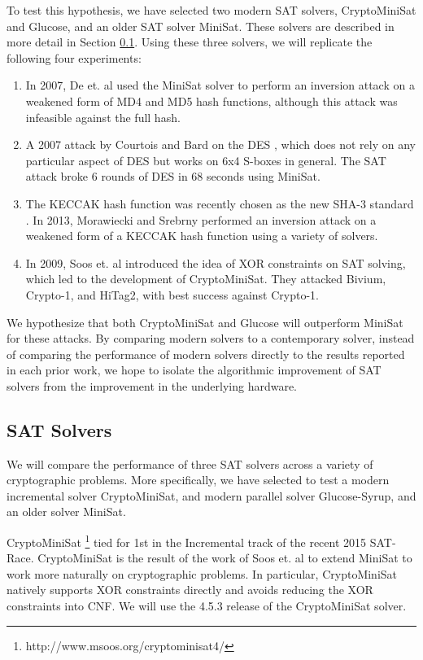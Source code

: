 To test this hypothesis, we have selected two modern SAT solvers, CryptoMiniSat and Glucose, and an older SAT solver MiniSat. These solvers are described in more detail in Section \ref{sec:existingtools}. Using these three solvers, we will replicate the following four experiments:
\begin{enumerate}
	\item In 2007, De et. al \cite{DKV07} used the MiniSat solver to perform an inversion attack on a weakened form of MD4 and MD5 hash functions, although this attack was infeasible against the full hash.
	
	\item A 2007 attack by Courtois and Bard on the DES \cite{CB07}, which does not rely on any particular aspect of DES but works on 6x4 S-boxes in general. The SAT attack broke 6 rounds of DES in 68 seconds using MiniSat.
	
	\item The KECCAK hash function was recently chosen as the new SHA-3 standard \cite{USDOC15}. In 2013, Morawiecki and Srebrny \cite{MS13} performed an inversion attack on a weakened form of a {KECCAK} hash function using a variety of solvers. 
	
	\item In 2009, Soos et. al \cite{SNC09} introduced the idea of XOR constraints on SAT solving, which led to the development of CryptoMiniSat. They attacked Bivium, Crypto-1, and HiTag2, with best success against Crypto-1.
\end{enumerate}

We hypothesize that both CryptoMiniSat and Glucose will outperform MiniSat for these attacks. By comparing modern solvers to a contemporary solver, instead of comparing the performance of modern solvers directly to the results reported in each prior work, we hope to isolate the algorithmic improvement of SAT solvers from the improvement in the underlying hardware.

\subsection{SAT Solvers}
\label{sec:existingtools}

We will compare the performance of three SAT solvers across a variety of cryptographic problems. More specifically, we have selected to test a modern incremental solver CryptoMiniSat, and modern parallel solver Glucose-Syrup, and an older solver MiniSat.

CryptoMiniSat \footnote{http://www.msoos.org/cryptominisat4/} tied for 1st in the Incremental track of the recent 2015 SAT-Race. CryptoMiniSat is the result of the work of Soos et. al \cite{SNC09} to extend MiniSat to work more naturally on cryptographic problems.  In particular, CryptoMiniSat natively supports XOR constraints directly and avoids reducing the XOR constraints into CNF. We will use the 4.5.3 release of the CryptoMiniSat solver.

